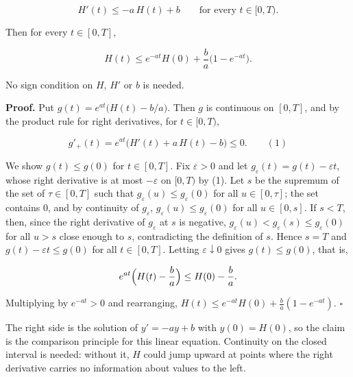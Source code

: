 \documentclass[11pt,a4paper]{report}
\begin{document}
\[H'(t)\le-a\,H(t)+b\qquad\text{for every }t\in[0,T).\]


Then for every \(t\in[0,T]\),


\[H(t)\le e^{-at}H(0)+\frac ba\bigl(1-e^{-at}\bigr).\]


No sign condition on \(H\), \(H'\) or \(b\) is needed.




\textbf{Proof.} Put \(g(t)=e^{at}\bigl(H(t)-b/a\bigr)\). Then \(g\) is continuous on \([0,T]\), and by the product rule for right derivatives, for \(t\in[0,T)\),


\[g'_+(t)=e^{at}\bigl(H'(t)+a\,H(t)-b\bigr)\le0.\qquad(1)\]


We show \(g(t)\le g(0)\) for \(t\in[0,T]\). Fix \(\varepsilon>0\) and let \(g_\varepsilon(t)=g(t)-\varepsilon t\), whose right derivative is at most \(-\varepsilon\) on \([0,T)\) by (1). Let \(s\) be the supremum of the set of \(\tau\in[0,T]\) such that \(g_\varepsilon(u)\le g_\varepsilon(0)\) for all \(u\in[0,\tau]\); the set contains \(0\), and by continuity of \(g_\varepsilon\), \(g_\varepsilon(u)\le g_\varepsilon(0)\) for all \(u\in[0,s]\). If \(s<T\), then, since the right derivative of \(g_\varepsilon\) at \(s\) is negative, \(g_\varepsilon(u)<g_\varepsilon(s)\le g_\varepsilon(0)\) for all \(u>s\) close enough to \(s\), contradicting the definition of \(s\). Hence \(s=T\) and \(g(t)-\varepsilon t\le g(0)\) for all \(t\in[0,T]\). Letting \(\varepsilon\downarrow0\) gives \(g(t)\le g(0)\), that is,


\[e^{at}\Bigl(H(t)-\frac ba\Bigr)\le H(0)-\frac ba.\]


Multiplying by \(e^{-at}>0\) and rearranging, \(H(t)\le e^{-at}H(0)+\frac ba(1-e^{-at})\). \(\square\)




The right side is the solution of \(y'=-ay+b\) with \(y(0)=H(0)\), so the claim is the comparison principle for this linear equation. Continuity on the closed interval is needed: without it, \(H\) could jump upward at points where the right derivative carries no information about values to the left.
\end{document}
